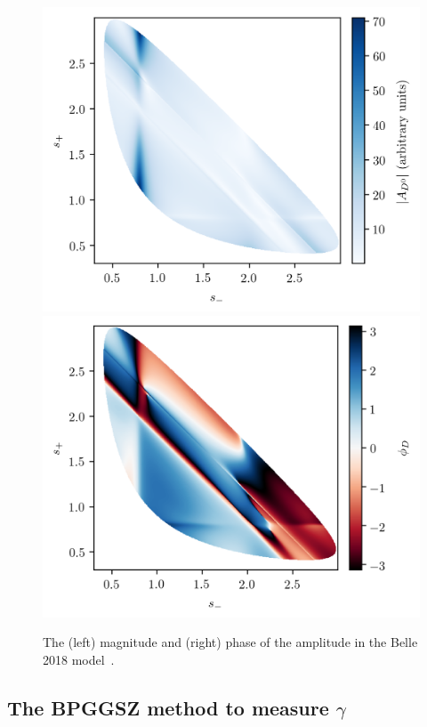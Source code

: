 \begin{figure}[tb]
    \centering
    \includegraphics[width=0.48\columnwidth]{figures/theory/ampD.png}
    \includegraphics[width=0.48\columnwidth]{figures/theory/phiD.png}
    \caption{The (left) magnitude and (right) phase of the \DtoKspipi amplitude in the Belle 2018 model~\cite{Belle2018}.}
    \label{fig:amplitude_models}
\end{figure}


\subsection{\texorpdfstring{The BPGGSZ method to measure $\gamma$}{The BPGGSZ method to measure gamma}} %
\label{sub:the_ggsz_method_to_measure_gamma}

